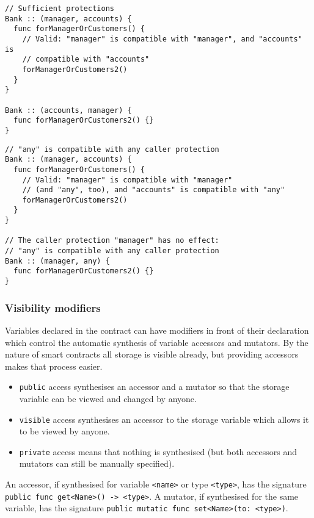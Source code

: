 \begin{verbatim}
// Sufficient protections
Bank :: (manager, accounts) {
  func forManagerOrCustomers() {
    // Valid: "manager" is compatible with "manager", and "accounts" is
    // compatible with "accounts"
    forManagerOrCustomers2()
  }
}

Bank :: (accounts, manager) {
  func forManagerOrCustomers2() {}
}
\end{verbatim}

\begin{verbatim}
// "any" is compatible with any caller protection
Bank :: (manager, accounts) {
  func forManagerOrCustomers() {
    // Valid: "manager" is compatible with "manager"
    // (and "any", too), and "accounts" is compatible with "any"
    forManagerOrCustomers2()
  }
}

// The caller protection "manager" has no effect:
// "any" is compatible with any caller protection
Bank :: (manager, any) {
  func forManagerOrCustomers2() {}
}
\end{verbatim}

\subsubsection{Visibility modifiers}
\label{sec:appendix-b-visibility-modifiers}

Variables declared in the contract can have modifiers in front of their declaration which control the automatic synthesis of variable accessors and mutators. By the nature of smart contracts all storage is visible already, but providing accessors makes that process easier.

\begin{itemize}
	\item \texttt{public} access synthesises an accessor and a mutator so that the storage variable can be viewed and changed by anyone.
	\item \texttt{visible} access synthesises an accessor to the storage variable which allows it to be viewed by anyone.
	\item \texttt{private} access means that nothing is synthesised (but both accessors and mutators can still be manually specified).
\end{itemize}

An accessor, if synthesised for variable \texttt{<name>} or type \texttt{<type>}, has the signature \texttt{public func get<Name>() -> <type>}. A mutator, if synthesised for the same variable, has the signature \texttt{public mutatic func set<Name>(to: <type>)}.

